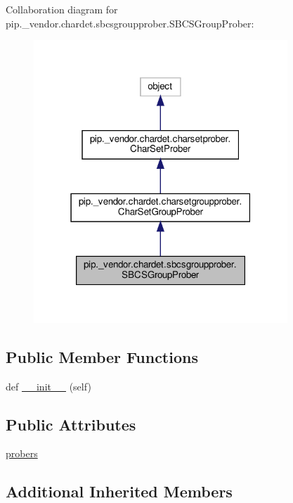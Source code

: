 Collaboration diagram for pip.\+\_\+vendor.\+chardet.\+sbcsgroupprober.\+S\+B\+C\+S\+Group\+Prober\+:
\nopagebreak
\begin{figure}[H]
\begin{center}
\leavevmode
\includegraphics[width=271pt]{classpip_1_1__vendor_1_1chardet_1_1sbcsgroupprober_1_1SBCSGroupProber__coll__graph}
\end{center}
\end{figure}
\subsection*{Public Member Functions}
\begin{DoxyCompactItemize}
\item 
def \hyperlink{classpip_1_1__vendor_1_1chardet_1_1sbcsgroupprober_1_1SBCSGroupProber_a3cdd822a95c7bbd260808a1a2727d26c}{\+\_\+\+\_\+init\+\_\+\+\_\+} (self)
\end{DoxyCompactItemize}
\subsection*{Public Attributes}
\begin{DoxyCompactItemize}
\item 
\hyperlink{classpip_1_1__vendor_1_1chardet_1_1sbcsgroupprober_1_1SBCSGroupProber_a99f1b6ef4d031626a165702ba3ad3fd6}{probers}
\end{DoxyCompactItemize}
\subsection*{Additional Inherited Members}


